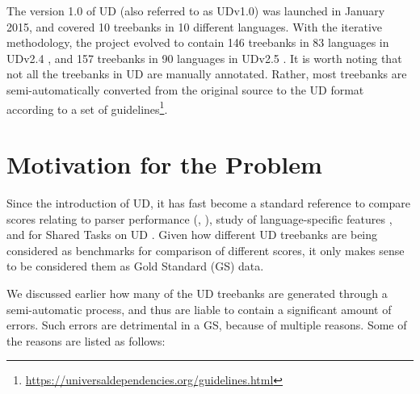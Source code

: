 The version 1.0 of UD (also referred to as UDv1.0) \citep{UDv1.0} was launched in January 2015, and covered 10 treebanks in 10 different languages. With the iterative methodology, the project evolved to contain 146 treebanks in 83 languages in UDv2.4 \citep{UDv2.4}, and 157 treebanks in 90 languages in UDv2.5 \citep{UDv2.5}. It is worth noting that not all the treebanks in UD are manually annotated. Rather, most treebanks are semi-automatically converted from the original source to the UD format according to a set of guidelines\footnote{\url{https://universaldependencies.org/guidelines.html}}.

\section{Motivation for the Problem}

Since the introduction of UD, it has fast become a standard reference to compare scores relating to parser performance (\cite{parser-performance1}, \cite{parser-performance2}), study of language-specific features \citep{language-study}, and for Shared Tasks on UD \citep{ud-shared-task}. Given how different UD treebanks are being considered as benchmarks for comparison of different scores, it only makes sense to be considered them as Gold Standard (GS) data.

We discussed earlier how many of the UD treebanks are generated through a semi-automatic process, and thus are liable to contain a significant amount of errors. Such errors are detrimental in a GS, because of multiple reasons. Some of the reasons are listed as follows:

